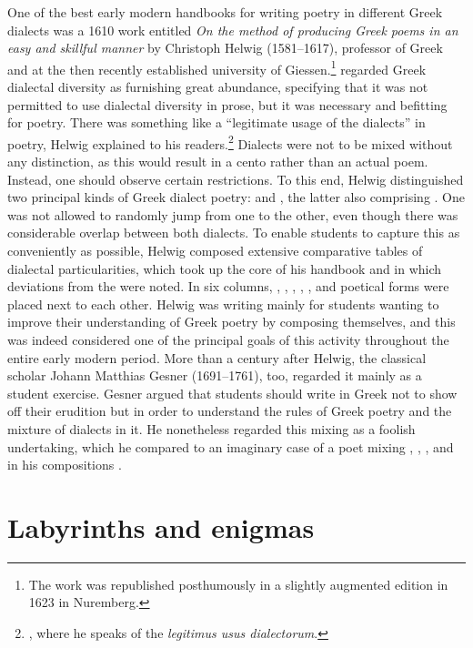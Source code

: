 One of the best early modern handbooks for writing poetry in different Greek dialects was a 1610 work entitled \textit{On the method of producing Greek poems in an easy and skillful manner} by Christoph Helwig (1581–1617), professor of Greek and  at the then recently established university of Giessen.\footnote{The work was republished posthumously in a slightly augmented edition in 1623 in Nuremberg.} \citet[19]{Helwig1610} regarded Greek dialectal diversity as furnishing great abundance, specifying that it was not permitted to use dialectal diversity in prose, but it was necessary and befitting for poetry. There was something like a “legitimate usage of the dialects” in poetry, Helwig explained to his readers.\footnote{\citet[21–24]{Helwig1610}, where he speaks of the \textit{legitimus usus dialectorum}.} Dialects were not to be mixed without any distinction, as this would result in a cento rather than an actual poem. Instead, one should observe certain restrictions. To this end, Helwig distinguished two principal kinds of Greek dialect poetry:  and , the latter also comprising . One was not allowed to randomly jump from one to the other, even though there was considerable overlap between both dialects. To enable students to capture this as conveniently as possible, Helwig composed extensive comparative tables of dialectal particularities, which took up the core of his handbook and in which deviations from the  were noted. In six columns, , , , , , and poetical forms were placed next to each other. Helwig was writing mainly for students wanting to improve their understanding of Greek poetry by composing themselves, and this was indeed considered one of the principal goals of this activity throughout the entire early modern period. More than a century after Helwig, the  classical scholar Johann Matthias Gesner (1691–1761), too, regarded it mainly as a student exercise. Gesner argued that students should write in Greek not to show off their erudition but in order to understand the rules of Greek poetry and the mixture of dialects in it. He nonetheless regarded this mixing as a foolish undertaking, which he compared to an imaginary case of a  poet mixing , , , and  in his compositions \citep[162]{Gesner1774}.

\section{Labyrinths and enigmas}\label{sec:3.3}

